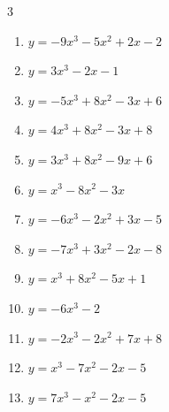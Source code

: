 \begin{multicols}{3}
\begin{enumerate}
  \item $y=-9x^{3}-5x^{2}+2x-2$


  \item $y=3x^{3}-2x-1$


  \item $y=-5x^{3}+8x^{2}-3x+6$


  \item $y=4x^{3}+8x^{2}-3x+8$


  \item $y=3x^{3}+8x^{2}-9x+6$


  \item $y=x^{3}-8x^{2}-3x$


  \item $y=-6x^{3}-2x^{2}+3x-5$


  \item $y=-7x^{3}+3x^{2}-2x-8$


  \item $y=x^{3}+8x^{2}-5x+1$


  \item $y=-6x^{3}-2$


  \item $y=-2x^{3}-2x^{2}+7x+8$


\columnbreak %

  \item $y=x^{3}-7x^{2}-2x-5$


  \item $y=7x^{3}-x^{2}-2x-5$


\end{enumerate}
\end{multicols}

